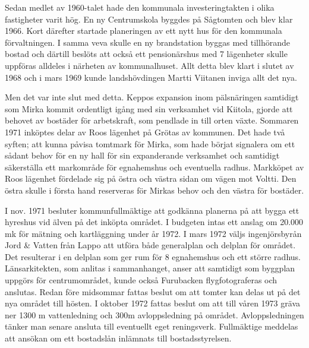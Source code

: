 



Sedan medlet av 1960-talet hade den kommunala investeringtakten i olika fastigheter varit hög. En ny Centrumskola byggdes på Sågtomten och blev klar 1966. Kort därefter startade planeringen av ett nytt hus för den kommunala förvaltningen. I samma veva skulle en ny brandstation byggas med tillhörande bostad och därtill beslöts att också ett pensionärshus med 7 lägenheter skulle uppföras alldeles i närheten av kommunalhuset. Allt detta blev klart i slutet av 1968 och i mars 1969 kunde landshövdingen Martti Viitanen inviga allt det nya.

Men det var inte slut med detta. Keppos expansion inom pälsnäringen samtidigt som Mirka kommit ordentligt igång med sin verksamhet vid Kiitola, gjorde att behovet av bostäder för arbetskraft, som pendlade in till orten växte. Sommaren 1971 inköptes delar av Roos lägenhet på Grötas av kommunen. Det hade två syften; att kunna påvisa tomtmark för Mirka, som hade börjat signalera om ett sådant behov för en ny hall för sin expanderande verksamhet och samtidigt säkerställa ett markområde för egnahemshus och eventuella radhus. Markköpet av Roos lägenhet fördelade sig på östra och västra sidan om vägen mot Voltti. Den östra skulle i första hand reserveras för Mirkas behov och den västra för bostäder.


I nov. 1971 besluter kommunfullmäktige att godkänna planerna på att bygga ett hyreshus vid älven på det inköpta området. I budgeten intas ett anslag om 20.000 mk för mätning och kartläggning under år 1972. I mars 1972 väljs ingenjörsbyrån Jord \& Vatten från Lappo att utföra både generalplan och delplan för området. Det resulterar i en delplan som ger rum för 8 egnahemshus och ett större radhus. Länsarkitekten, som anlitas i sammanhanget, anser att samtidigt som byggplan uppgörs för centrumområdet, kunde också Furubacken flygfotograferas och anslutas. Redan före midsommar fattas beslut om att tomter kan delas ut på det nya området till hösten. I oktober 1972 fattas beslut om att till våren 1973 gräva ner 1300 m vattenledning och 300m avloppsledning på området. Avloppsledningen tänker man senare ansluta till eventuellt eget reningsverk. Fullmäktige meddelas att ansökan om ett bostadslån inlämnats till bostadsstyrelsen.

